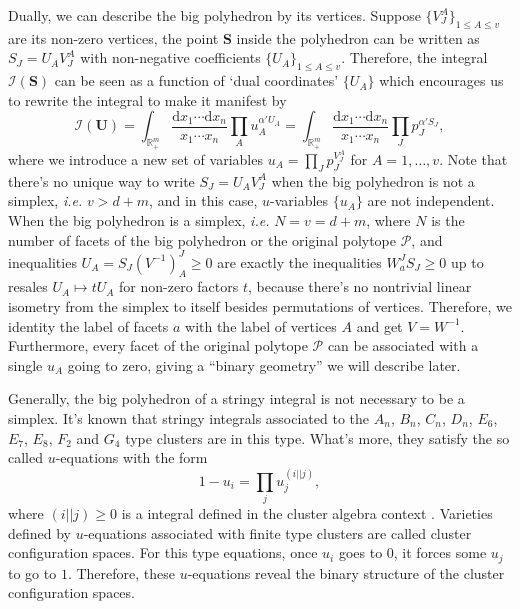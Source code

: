 \documentclass[hidelinks,12pt]{article}
\begin{document}
Dually, we can describe the big polyhedron by its vertices. Suppose 
$\{V_J^A\}_{1\leq A\leq v}$ are its non-zero vertices, the point $\mathbf S$ inside 
the polyhedron can be written as $S_J = U_A V^A_J$ with non-negative coefficients 
$\{U_A\}_{1\leq A\leq v}$.  Therefore, the integral $\mathcal I(\mathbf S)$
can be seen as a function of `dual coordinates' $\{U_A\}$ which encourages us to 
rewrite the integral to make it manifest by
\[
	\mathcal I(\mathbf U)=
	\int_{\mathbb R_+^m}\frac{\mathrm d x_1\cdots \mathrm d x_n}{x_1\cdots x_n}
	\prod_{A}u_A^{\alpha' U_A}
	=
	\int_{\mathbb R_+^m}\frac{\mathrm d x_1\cdots \mathrm d x_n}{x_1\cdots x_n}
	\prod_{J}p_J^{\alpha' S_J},
\]
where we introduce a new set of variables $u_A = \prod_J p_J^{V_J^A}$ for 
$A=1,\dots,v$. Note that there's no unique way to write $S_J=U_AV_J^A$ when
the big polyhedron is not a simplex, \textit{i.e.} $v>d+m$, and in this case,
$u$-variables $\{u_A\}$ are not independent. 
When the big polyhedron is a simplex, \textit{i.e.} $N=v=d+m$, where $N$ is 
the number of facets of the big polyhedron or the original polytope $\mathcal P$,
and inequalities $U_A=S_J(V^{-1})^J_A\geq 0$ are exactly the inequalities
$W_a^J S_J\geq 0$ up to resales $U_A\mapsto t U_A$ for non-zero factors $t$, because
there's no nontrivial linear isometry from the simplex to itself besides permutations
of vertices. Therefore, we identity the label of facets $a$ with the label of 
vertices $A$ and get $V=W^{-1}$. Furthermore, every facet of the original polytope
$\mathcal P$ can be associated with a single $u_A$ going to zero, 
giving a ``binary geometry'' we will describe later.

Generally, the big polyhedron of a stringy integral is not necessary to be a simplex.
It's known that stringy integrals associated to the $A_n$, $B_n$, $C_n$, $D_n$,
$E_6$, $E_7$, $E_8$, $F_2$ and $G_4$ type clusters are in this type. What's more,
they satisfy the so called $u$-equations with the form
\begin{equation}\label{perfectu}
	1-u_i=\prod_{j}u_j^{(i||j)},
\end{equation}
where $(i||j)\geq 0$ is a integral defined in the cluster algebra context \cite{}.
Varieties defined by $u$-equations associated with finite type clusters 
are called cluster configuration spaces. 
For this type equations, once $u_i$ goes to $0$, it forces some $u_j$ to go to $1$.
Therefore, these $u$-equations reveal the binary structure of the cluster
configuration spaces. 
\end{document}
